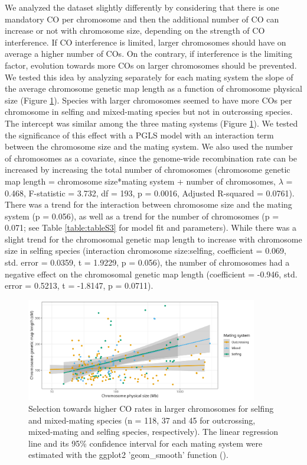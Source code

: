 \documentclass{article}
\begin{document}
We analyzed the dataset slightly differently by considering that there is one mandatory CO per chromosome and then the additional number of CO can increase or not with chromosome size, depending on the strength of CO interference. If CO interference is limited, larger chromosomes should have on average a higher number of COs. On the contrary, if interference is the limiting factor, evolution towards more COs on larger chromosomes should be prevented. We tested this idea by analyzing separately for each mating system the slope of the average chromosome genetic map length as a function of chromosome physical size (Figure \ref{figure:Fig4}). Species with larger chromosomes seemed to have more COs per chromosome in selfing and mixed-mating species but not in outcrossing species. The intercept was similar among the three mating systems (Figure \ref{figure:Fig4}). We tested the significance of this effect with a PGLS model with an interaction term between the chromosome size and the mating system. We also used the number of chromosomes as a covariate, since the genome-wide recombination rate can be increased by increasing the total number of chromosomes (chromosome genetic map length = chromosome size*mating system + number of chromosomes, $\lambda$ = 0.468, F-statistic = 3.732, df = 193, p = 0.0016, Adjusted R-squared = 0.0761). There was a trend for the interaction between chromosome size and the mating system (p = 0.056), as well as a trend for the number of chromosomes (p = 0.071; see Table \ref{table:tableS3} for model fit and parameters). While there was a slight trend for the chromosomal genetic map length to increase with chromosome size in selfing species (interaction chromosome size:selfing, coefficient = 0.069, std. error = 0.0359, t = 1.9229, p = 0.056), the number of chromosomes had a negative effect on the chromosomal genetic map length (coefficient = -0.946, std. error = 0.5213, t = -1.8147, p = 0.0711).




\begin{figure}[h!]
  \includegraphics[width=0.9\textwidth]{figures/Fig4.jpeg}
  \centering
  \caption{Selection towards higher CO rates in larger chromosomes for selfing and mixed-mating species (n = 118, 37 and 45 for outcrossing, mixed-mating and selfing species, respectively). The linear regression line and its 95\% confidence interval for each mating system were estimated with the ggplot2 'geom\_smooth' function (\cite{wickhamGgplot2ElegantGraphics2016}).}
  \label{figure:Fig4}
\end{figure}
\end{document}

